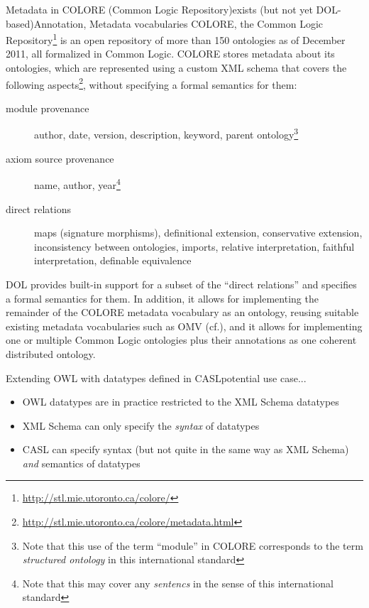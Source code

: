 \documentclass[%
\ifpretendfinal
final%
\else
draft%
\fi,
a4paper,
wd]{isov2}
\makeatletter
\newcommand*{\cf}{cf.\@\xspace}
\newcommand*{\termref}[1]{\textit{#1}}
\makeatother
\begin{document}
\begin{usecase}{Metadata in COLORE (Common Logic Repository)}{exists (but not yet DOL-based)}{Annotation, Metadata vocabularies}
  COLORE, the Common Logic Repository\footnote{\url{http://stl.mie.utoronto.ca/colore/}} is an open repository of more than 150 ontologies as of December 2011, all formalized in Common Logic.  COLORE stores metadata about its ontologies, which are represented using a custom XML schema that covers the following aspects\footnote{\url{http://stl.mie.utoronto.ca/colore/metadata.html}}, without specifying a formal semantics for them:
  \begin{description}
  \item[module provenance] author, date, version, description, keyword, parent ontology\footnote{Note that this use of the term ``module'' in COLORE corresponds
to the term \termref{structured ontology} in this international standard}
  \item[axiom source provenance] name, author, year\footnote{Note that this may cover any \termref{sentencs} in the sense of this international standard}
  \item[direct relations] maps (signature morphisms), definitional extension, conservative extension, inconsistency between ontologies, imports, relative interpretation, faithful interpretation, definable equivalence
  \end{description}

  DOL provides built-in support for a subset of the “direct relations” and specifies a formal semantics for them.  In addition, it allows for implementing the remainder of the COLORE metadata vocabulary as an ontology, reusing suitable existing metadata vocabularies such as OMV (\cf {}), and it allows for implementing one or multiple Common Logic ontologies plus their annotations as one coherent distributed ontology.
\end{usecase}

\begin{usecase}{Extending OWL with datatypes defined in CASL}{potential use case}{...}
  \begin{itemize}
  \item OWL datatypes are in practice restricted to the XML Schema datatypes
  \item XML Schema can only specify the \emph{syntax} of datatypes
  \item CASL can specify syntax (but not quite in the same way as XML Schema) \emph{and} semantics of datatypes
  \end{itemize}
\end{usecase}
\end{document}
